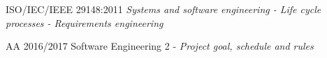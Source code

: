 \begin{thebibliography}{1}

	ISO/IEC/IEEE 29148:2011 \emph{Systems and software engineering - Life cycle processes - Requirements engineering}
	
	AA 2016/2017 Software Engineering 2 - \emph{Project goal, schedule and rules}

\end{thebibliography}